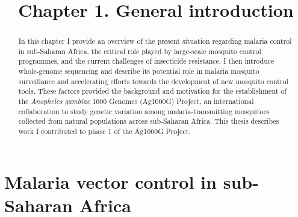 \documentclass[a4paper,11pt,abstracton,hidelinks]{scrartcl}
\title{
Chapter 1. General introduction
}
\author{}
\begin{document}
\renewcommand{\abstractname}{Summary}


\maketitle


\begin{abstract}


In this chapter I provide an overview of the present situation regarding malaria control in sub-Saharan Africa, the critical role played by large-scale mosquito control programmes, and the current challenges of insecticide resistance.
%
I then introduce whole-genome sequencing and describe its potential role in malaria mosquito surveillance and accelerating efforts towards the development of new mosquito control tools.
%
These factors provided the background and motivation for the establishment of the \textit{Anopheles gambiae} 1000 Genomes (Ag1000G) Project, an international collaboration to study genetic variation among malaria-transmitting mosquitoes collected from natural populations across sub-Saharan Africa.
%
This thesis describes work I contributed to phase 1 of the Ag1000G Project.
%


\end{abstract}


\tableofcontents


\section{Malaria vector control in sub-Saharan Africa}
\end{document}
